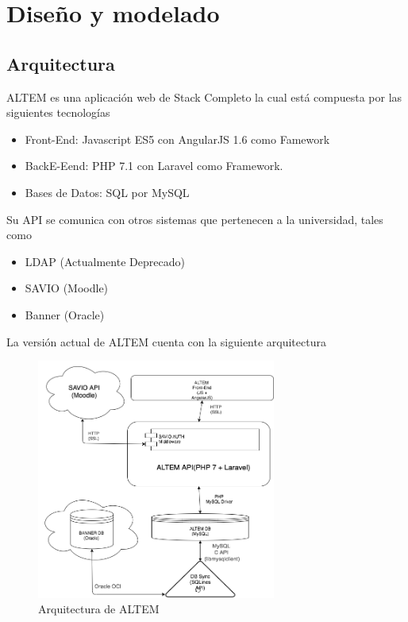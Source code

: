 \chapter{Diseño y modelado}

\section{Arquitectura}
ALTEM es una aplicación web de Stack Completo la cual está compuesta por las siguientes tecnologías
\begin{itemize}
    \item Front-End: Javascript ES5 con AngularJS 1.6 como Famework
    \item BackE-Eend: PHP 7.1 con Laravel como Framework.
    \item Bases de Datos: SQL por MySQL
\end{itemize}

Su API se comunica con otros sistemas que pertenecen a la universidad, tales como

\begin{itemize}
    \item LDAP (Actualmente Deprecado)
    \item SAVIO (Moodle)
    \item Banner (Oracle)
\end{itemize}

La versión actual de ALTEM cuenta con la siguiente arquitectura

\begin{figure}[H]
    \centering
    \includegraphics[width=0.7\textwidth]{img/ALTEM.png}
    \caption{Arquitectura de ALTEM}
\end{figure}



